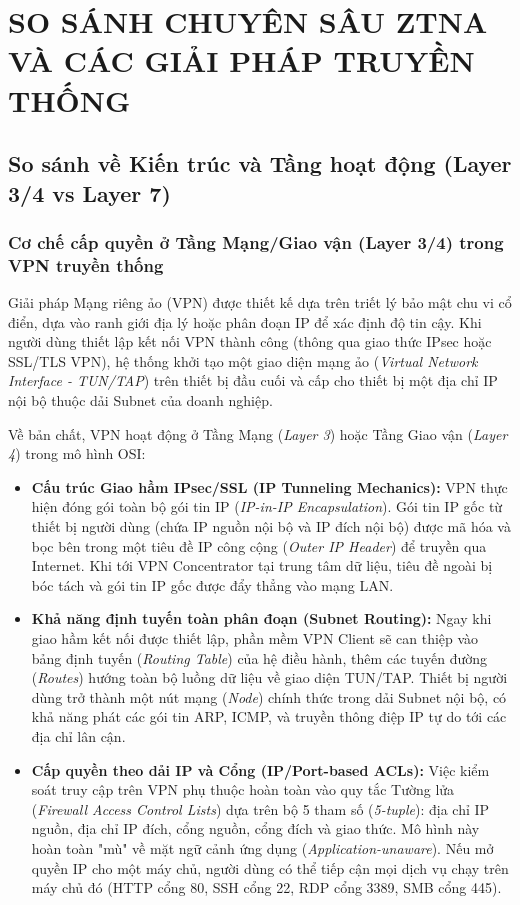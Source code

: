 \chapter{SO SÁNH CHUYÊN SÂU ZTNA VÀ CÁC GIẢI PHÁP TRUYỀN THỐNG}
\label{chap:chuong_4}

\section{So sánh về Kiến trúc và Tầng hoạt động (Layer 3/4 vs Layer 7)}
\label{sec:4_1}

\subsection{Cơ chế cấp quyền ở Tầng Mạng/Giao vận (Layer 3/4) trong VPN truyền thống}
\label{subsec:4_1_1}

Giải pháp Mạng riêng ảo (VPN) được thiết kế dựa trên triết lý bảo mật chu vi cổ điển, dựa vào ranh giới địa lý hoặc phân đoạn IP để xác định độ tin cậy. Khi người dùng thiết lập kết nối VPN thành công (thông qua giao thức IPsec hoặc SSL/TLS VPN), hệ thống khởi tạo một giao diện mạng ảo (\textit{Virtual Network Interface - TUN/TAP}) trên thiết bị đầu cuối và cấp cho thiết bị một địa chỉ IP nội bộ thuộc dải Subnet của doanh nghiệp.

Về bản chất, VPN hoạt động ở Tầng Mạng (\textit{Layer 3}) hoặc Tầng Giao vận (\textit{Layer 4}) trong mô hình OSI:

\begin{itemize}
    \item \textbf{Cấu trúc Giao hầm IPsec/SSL (IP Tunneling Mechanics):} VPN thực hiện đóng gói toàn bộ gói tin IP (\textit{IP-in-IP Encapsulation}). Gói tin IP gốc từ thiết bị người dùng (chứa IP nguồn nội bộ và IP đích nội bộ) được mã hóa và bọc bên trong một tiêu đề IP công cộng (\textit{Outer IP Header}) để truyền qua Internet. Khi tới VPN Concentrator tại trung tâm dữ liệu, tiêu đề ngoài bị bóc tách và gói tin IP gốc được đẩy thẳng vào mạng LAN.
    \item \textbf{Khả năng định tuyến toàn phân đoạn (Subnet Routing):} Ngay khi giao hầm kết nối được thiết lập, phần mềm VPN Client sẽ can thiệp vào bảng định tuyến (\textit{Routing Table}) của hệ điều hành, thêm các tuyến đường (\textit{Routes}) hướng toàn bộ luồng dữ liệu về giao diện TUN/TAP. Thiết bị người dùng trở thành một nút mạng (\textit{Node}) chính thức trong dải Subnet nội bộ, có khả năng phát các gói tin ARP, ICMP, và truyền thông điệp IP tự do tới các địa chỉ lân cận.
    \item \textbf{Cấp quyền theo dải IP và Cổng (IP/Port-based ACLs):} Việc kiểm soát truy cập trên VPN phụ thuộc hoàn toàn vào quy tắc Tường lửa (\textit{Firewall Access Control Lists}) dựa trên bộ 5 tham số (\textit{5-tuple}): địa chỉ IP nguồn, địa chỉ IP đích, cổng nguồn, cổng đích và giao thức. Mô hình này hoàn toàn "mù" về mặt ngữ cảnh ứng dụng (\textit{Application-unaware}). Nếu mở quyền IP cho một máy chủ, người dùng có thể tiếp cận mọi dịch vụ chạy trên máy chủ đó (HTTP cổng 80, SSH cổng 22, RDP cổng 3389, SMB cổng 445).
\end{itemize}

